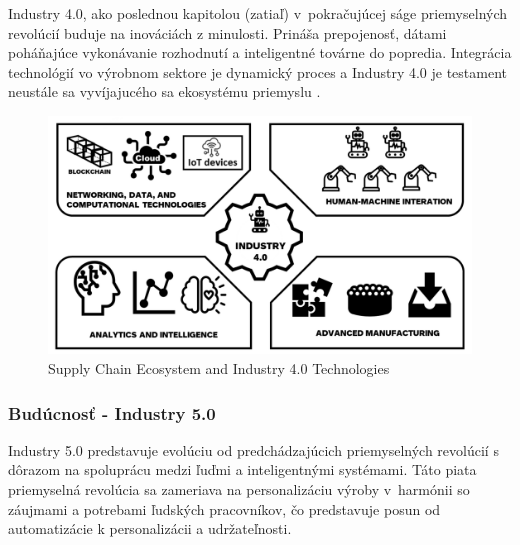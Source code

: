 Industry 4.0, ako poslednou kapitolou (zatiaľ) v~pokračujúcej ságe priemyselných revolúcií buduje na inováciách z minulosti. Prináša prepojenosť, dátami poháňajúce vykonávanie rozhodnutí a inteligentné továrne do popredia. Integrácia technológií vo výrobnom sektore je dynamický proces a Industry 4.0 je testament neustále sa vyvíjajucého sa ekosystému priemyslu \cite{rajan2023industry40}. 

\begin{figure}[h]
    \centering
    \includegraphics[width=1\textwidth]{img/logistics-06-00081-g003.png}
    \caption{Supply Chain Ecosystem and Industry 4.0 Technologies \cite{rajasanthi2022industry40}}
    \label{fig:industry40}
\end{figure}

\subsubsection{Budúcnosť - Industry 5.0}

Industry 5.0 predstavuje evolúciu od predchádzajúcich priemyselných revolúcií s dôrazom na spoluprácu medzi ľuďmi a inteligentnými systémami. Táto piata priemyselná revolúcia sa zameriava na personalizáciu výroby v~harmónii so záujmami a potrebami ľudských pracovníkov, čo predstavuje posun od automatizácie k personalizácii a udržateľnosti.

